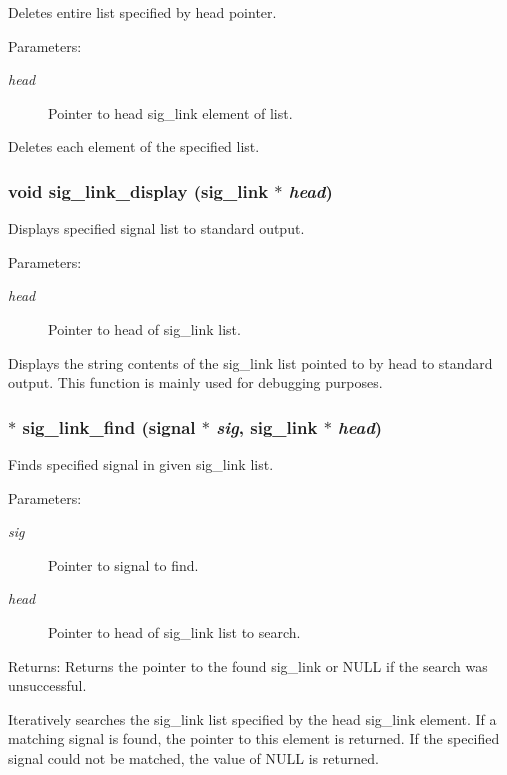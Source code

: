 Deletes entire list specified by head pointer.

\begin{Desc}
\item[Parameters:]
\begin{description}
\item[{\em head}]Pointer to head sig\_\-link element of list.\end{description}
\end{Desc}
Deletes each element of the specified list. 
\subsubsection{\setlength{\rightskip}{0pt plus 5cm}void sig\_\-link\_\-display ({\bf sig\_\-link} $\ast$ {\em head})}\label{link_8c_a9}


Displays specified signal list to standard output.

\begin{Desc}
\item[Parameters:]
\begin{description}
\item[{\em head}]Pointer to head of sig\_\-link list.\end{description}
\end{Desc}
Displays the string contents of the sig\_\-link list pointed to by head to standard output. This function is mainly used for debugging purposes. 
\subsubsection{$\ast$ sig\_\-link\_\-find ({\bf signal} $\ast$ {\em sig}, {\bf sig\_\-link} $\ast$ {\em head})}\label{link_8c_a14}


Finds specified signal in given sig\_\-link list.

\begin{Desc}
\item[Parameters:]
\begin{description}
\item[{\em sig}]Pointer to signal to find. \item[{\em head}]Pointer to head of sig\_\-link list to search. \end{description}
\end{Desc}
\begin{Desc}
\item[Returns:]Returns the pointer to the found sig\_\-link or NULL if the search was unsuccessful.\end{Desc}
Iteratively searches the sig\_\-link list specified by the head sig\_\-link element. If a matching signal is found, the pointer to this element is returned. If the specified signal could not be matched, the value of NULL is returned. 

